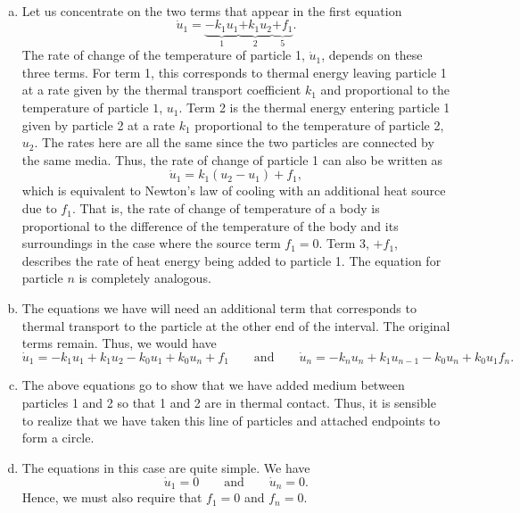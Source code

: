 \documentclass[12pt]{article} %
\begin{document}
\begin{solution}~
\begin{enumerate}[(a)]
    \item Let us concentrate on the two terms that appear in the first equation
    \[
\dot{u}_1 = \underbrace{-k_1 u_1}_{1} \underbrace{+ k_1 u_{2}}_{2}\underbrace{+f_1}_5.
    \]
    The rate of change of the temperature of particle 1, $\dot{u}_1$, depends on these three terms. For term 1, this corresponds to thermal energy leaving particle 1 at a rate given by the thermal transport coefficient $k_1$ and proportional to the temperature of particle $1$, $u_1$. Term 2 is the thermal energy entering particle 1 given by particle 2 at a rate $k_1$ proportional to the temperature of particle 2, $u_2$. The rates here are all the same since the two particles are connected by the same media. Thus, the rate of change of particle 1 can also be written as
    \[
    \dot{u}_1 = k_1(u_2-u_1) +f_1,
    \]
    which is equivalent to Newton's law of cooling with an additional heat source due to $f_1$. That is, the rate of change of temperature of a body is proportional to the difference of the temperature of the body and its surroundings in the case where the source term $f_1=0$. Term 3, $+f_1$, describes the rate of heat energy being added to particle 1. The equation for particle $n$ is completely analogous.

    \item The equations we have will need an additional term that corresponds to thermal transport to the particle at the other end of the interval. The original terms remain. Thus, we would have
    \[
\dot{u}_1 = -k_1 u_1 + k_1 u_{2} -k_0 u_1  + k_0 u_n+ f_1 \qquad \textrm{and} \qquad \dot{u}_n = -k_n u_{n} + k_1 u_{n-1} - k_0 u_n + k_0u_1 f_n.
    \]
    
    \item The above equations go to show that we have added medium between particles 1 and 2 so that 1 and 2 are in thermal contact. Thus, it is sensible to realize that we have taken this line of particles and attached endpoints to form a circle.

    \item The equations in this case are quite simple. We have
    \[
    \dot{u}_1 = 0 \qquad \textrm{and} \qquad \dot{u}_n = 0.
    \]
    Hence, we must also require that $f_1=0$ and $f_n=0$.
    


\end{enumerate}
\end{solution}
\end{document}
